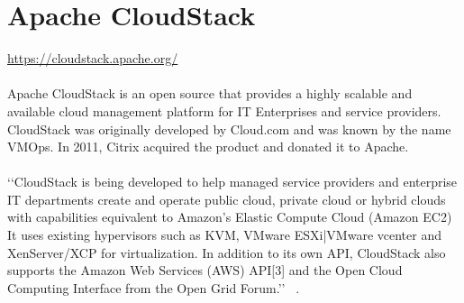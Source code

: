 \graphicspath{ {images/} }
\section{Apache CloudStack}
\url{ https://cloudstack.apache.org/} \\
\\
Apache CloudStack is an open source that provides a highly scalable and available 
cloud management platform for IT
Enterprises and service providers. CloudStack was originally developed by Cloud.com and was known by the name VMOps. 
In 2011, Citrix acquired the product and donated it to Apache. \\
\\
‘‘CloudStack is being developed to help managed service providers and enterprise IT 
departments create and operate public cloud, private cloud or hybrid clouds
with capabilities equivalent to Amazon's Elastic Compute Cloud (Amazon EC2)
It uses existing hypervisors such as KVM, VMware ESXi|VMware vcenter and
XenServer/XCP for virtualization. In addition to its own API, CloudStack 
also supports the Amazon Web Services (AWS) API[3] and the Open Cloud Computing Interface from the Open Grid Forum.’’  
~\cite{ hid-sp18-417-wiki-cloudStack}. 

